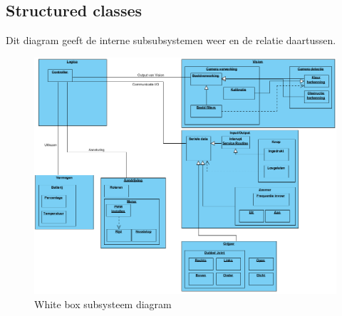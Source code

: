 \documentclass[12pt]{article} %
\begin{document}
\subsection{Structured classes}
Dit diagram geeft de interne subsubsystemen weer en de relatie daartussen.
\begin{center}
\begin{figure}[h]
\includegraphics[scale=.6]{WhiteBoxDiagram.png}
\caption{White box subsysteem diagram}
\label{fig:deployment}
\end{figure}
\end{center}
\clearpage
\newpage

%
\end{document}
